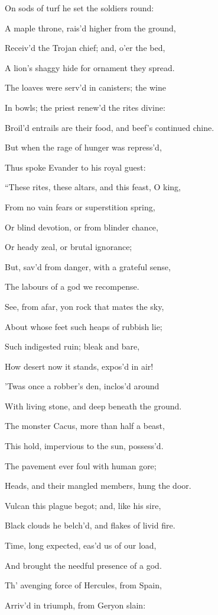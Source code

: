 On sods of turf he set the soldiers round:

A maple throne, rais’d higher from the ground,

Receiv’d the Trojan chief; and, o’er the bed,

A lion’s shaggy hide for ornament they spread.

The loaves were serv’d in canisters; the wine

In bowls; the priest renew’d the rites divine:

Broil’d entrails are their food, and beef’s continued chine.

But when the rage of hunger was repress’d,

Thus spoke Evander to his royal guest:

“These rites, these altars, and this feast, O king,

From no vain fears or superstition spring,

Or blind devotion, or from blinder chance,

Or heady zeal, or brutal ignorance;

But, sav’d from danger, with a grateful sense,

The labours of a god we recompense.

See, from afar, yon rock that mates the sky,

About whose feet such heaps of rubbish lie;

Such indigested ruin; bleak and bare,

How desert now it stands, expos’d in air!

’Twas once a robber’s den, inclos’d around

With living stone, and deep beneath the ground.

The monster Cacus, more than half a beast,

This hold, impervious to the sun, possess’d.

The pavement ever foul with human gore;

Heads, and their mangled members, hung the door.

Vulcan this plague begot; and, like his sire,

Black clouds he belch’d, and flakes of livid fire.

Time, long expected, eas’d us of our load,

And brought the needful presence of a god.

Th’ avenging force of Hercules, from Spain,

Arriv’d in triumph, from Geryon slain:

